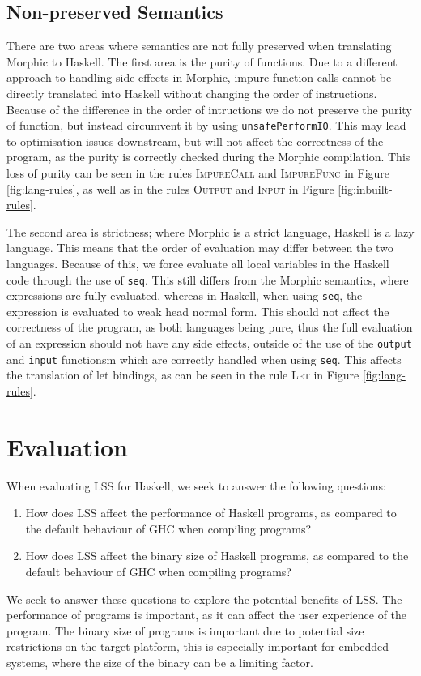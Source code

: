 \documentclass[a4paper,UKenglish,cleveref, autoref, thm-restate]{template/lipics-v2021}
\newcommand{\lss}{LSS\xspace}
\newcommand{\ghc}{GHC\xspace}
\begin{document}
\subsection{Non-preserved Semantics}
There are two areas where semantics are not fully preserved when translating Morphic to Haskell. The first area is the purity of functions. Due to a different approach to handling side effects in Morphic, impure function calls cannot be directly translated into Haskell without changing the order of instructions. Because of the difference in the order of intructions we do not preserve the purity of function, but instead circumvent it by using \verb|unsafePerformIO|. This may lead to optimisation issues downstream, but will not affect the correctness of the program, as the purity is correctly checked during the Morphic compilation. This loss of purity can be seen in the rules \textsc{ImpureCall} and \textsc{ImpureFunc} in Figure \ref{fig:lang-rules}, as well as in the rules \textsc{Output} and \textsc{Input} in Figure \ref{fig:inbuilt-rules}.

The second area is strictness; where Morphic is a strict language, Haskell is a lazy language. This means that the order of evaluation may differ between the two languages. Because of this, we force evaluate all local variables in the Haskell code through the use of \verb|seq|. This still differs from the Morphic semantics, where expressions are fully evaluated, whereas in Haskell, when using \verb|seq|, the expression is evaluated to weak head normal form. This should not affect the correctness of the program, as both languages being pure, thus the full evaluation of an expression should not have any side effects, outside of the use of the \verb|output| and \verb|input| functionsm which are correctly handled when using \verb|seq|. This affects the translation of let bindings, as can be seen in the rule \textsc{Let} in Figure \ref{fig:lang-rules}.

\section{Evaluation}
When evaluating \lss for Haskell, we seek to answer the following questions:
\begin{enumerate}
  \item How does \lss affect the performance of Haskell programs, as compared to the default behaviour of \ghc when compiling programs?
  \item How does \lss affect the binary size of Haskell programs, as compared to the default behaviour of \ghc when compiling programs?
\end{enumerate}
We seek to answer these questions to explore the potential benefits of \lss. The performance of programs is important, as it can affect the user experience of the program. The binary size of programs is important due to potential size restrictions on the target platform, this is especially important for embedded systems, where the size of the binary can be a limiting factor.
\end{document}
